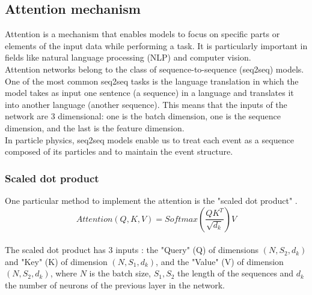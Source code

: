 \subsection{Attention mechanism}
Attention is a mechanism that enables models to focus on specific parts or elements of the input data while performing a task. It is particularly important in fields like natural language processing (NLP) and computer vision.\\
Attention networks belong to the class of sequence-to-sequence (seq2seq) models. 
One of the most common seq2seq tasks is the language translation in which the model takes as input one sentence (\ie a sequence) in a language and translates it into another language (\ie another sequence).
This means that the inputs of the network are 3 dimensional: one is the batch dimension, one is the sequence dimension, and the last is the feature dimension.\\
In particle physics, seq2seq models enable us to treat each event as a sequence composed of its particles and to maintain the event structure.

\subsubsection*{Scaled dot product}
One particular method to implement the attention is the "scaled dot product" \cite{Vaswani2017AttentionNeed}.\\
\begin{equation}
    \textit{Attention}(Q,K,V)=\textit{Softmax}\left(\frac{QK^T}{\sqrt{d_k}}\right)V
\end{equation}
\vspace{0.2cm}\\
The scaled dot product has 3 inputs \cite{Vaswani2017AttentionNeed}: the "Query" (Q) of dimensions $(N, S_2, d_k)$ and "Key" (K) of dimension $(N, S_1, d_k)$, and the "Value" (V) of dimension $(N, S_2, d_k)$, where $N$ is the batch size, $S_1,S_2$ the length of the sequences and $d_k$ the number of neurons of the previous layer in the network.\\


